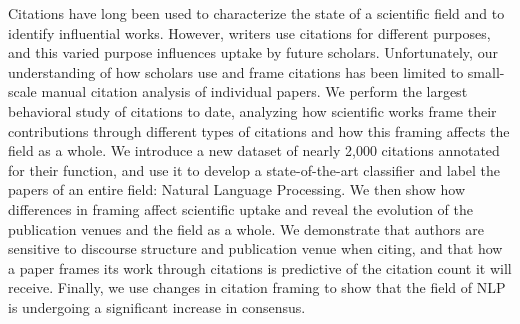 Citations have long been used to characterize the state of a scientific field and to identify influential works. However, writers use citations for different purposes, and this varied purpose influences uptake by future scholars. Unfortunately, our understanding of how scholars use and frame citations has been limited to small-scale manual citation analysis of individual papers. We perform the largest behavioral study of citations to date, analyzing how scientific works frame their contributions through different types of citations and how this framing affects the field as a whole. We introduce a new dataset of nearly 2,000 citations annotated for their function, and use it to develop a state-of-the-art classifier and label  the papers of an entire field: Natural Language Processing.  We then show how differences in framing affect scientific uptake and reveal the evolution of the publication venues and the field as a whole. We demonstrate that authors are sensitive to discourse structure and publication venue when citing, and that  how a paper frames its work through citations is predictive of the citation count it will receive. Finally, we use changes in citation framing to show that the field of NLP is undergoing a significant increase in consensus.